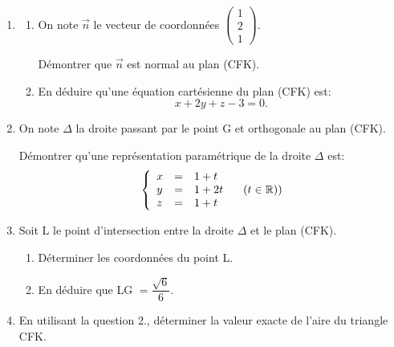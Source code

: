 \documentclass[10pt]{article}
\providecommand{\R}{\mathbb{R}}
\providecommand{\vect}[1]{\overrightarrow{#1}}
\begin{document}
\begin{enumerate}[start=3]
\item 
	\begin{enumerate}
		\item On note $\vect{n}$ le vecteur de coordonnées $\begin{pmatrix}1\\2\\1\end{pmatrix}$.
		
Démontrer que $\vect{n}$ est normal au plan (CFK).
		\item  En déduire qu'une équation cartésienne du plan (CFK) est:
\[x + 2y + z - 3 = 0.\]
	\end{enumerate}
\item On note $\Delta$ la droite passant par le point G et orthogonale au plan (CFK). 

Démontrer qu'une représentation paramétrique de la droite $\Delta$ est:
\[\left\{\begin{array}{l c l}
x&=&1 + t\\
y&=&1 + 2t\\
z&=&1 + t
\end{array}\right. \quad  (t \in \R))\]
\item Soit L le point d'intersection entre la droite $\Delta$ et le plan (CFK).
	\begin{enumerate}
		\item Déterminer les coordonnées du point L.
		\item En déduire que LG $= \dfrac{\sqrt 6}{6}$.
	\end{enumerate}
\item En utilisant la question 2., déterminer la valeur exacte de l'aire du triangle CFK.
\end{enumerate}

\bigskip
\end{document}
